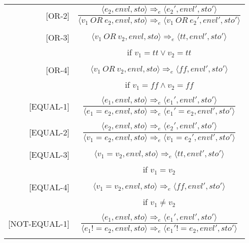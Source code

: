 \begin{longtable}[c] { r c }
  [OR-2] & \( 
    \dfrac { \langle e_2, envl, sto \rangle \Rightarrow_e \langle e_2', envl', sto' \rangle }
      { \langle v_1 \ OR \ e_2, envl, sto \rangle \Rightarrow_e \langle v_1 \ OR \ e_2', envl', sto' \rangle } \)
  \\
  & \\

  [OR-3] & \( 
    \langle v_1 \ OR \ v_2, envl, sto \rangle \Rightarrow_e \langle tt, envl', sto' \rangle \)
  \\
  & if \( v_1 = tt \lor v_2 = tt\) \\
  & \\

  [OR-4] & \( 
    \langle v_1 \ OR \ v_2, envl, sto \rangle \Rightarrow_e \langle ff, envl', sto' \rangle \)
  \\
  & if \( v_1 = ff \land  v_2 = ff \) \\
  & \\

  [EQUAL-1] & \( 
    \dfrac { \langle e_1, envl, sto \rangle \Rightarrow_e \langle e_1', envl', sto' \rangle }
      { \langle e_1 = e_2, envl, sto \rangle \Rightarrow_e \langle e_1' = e_2, envl', sto' \rangle } \)
  \\
  & \\

  [EQUAL-2] & \( 
    \dfrac { \langle e_2, envl, sto \rangle \Rightarrow_e \langle e_2', envl', sto' \rangle }
      { \langle v_1 = e_2, envl, sto \rangle \Rightarrow_e \langle v_1 = e_2', envl', sto' \rangle } \)
  \\
  & \\

  [EQUAL-3] & \( 
    \langle v_1 = v_2, envl, sto \rangle \Rightarrow_e \langle tt, envl', sto' \rangle \)
  \\
  & if \( v_1 = v_2 \) \\
  & \\

  [EQUAL-4] & \( 
    \langle v_1 = v_2, envl, sto \rangle \Rightarrow_e \langle ff, envl', sto' \rangle \)
  \\
  & if \( v_1 \neq v_2 \) \\
  & \\

  [NOT-EQUAL-1] & \( 
    \dfrac { \langle e_1, envl, sto \rangle \Rightarrow_e \langle e_1', envl', sto' \rangle }
      { \langle e_1 != e_2, envl, sto \rangle \Rightarrow_e \langle e_1' != e_2, envl', sto' \rangle } \)
  \\
  & \\


\end{longtable}

